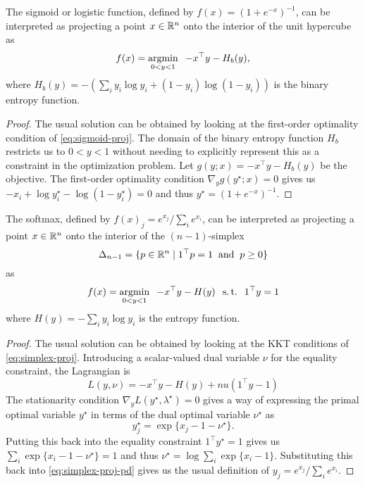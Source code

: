 \begin{theorem}
  The sigmoid or logistic function, defined by $f(x) = (1+e^{-x})^{-1}$,
  can be interpreted as projecting a point $x\in\mathbb{R}^n$ onto
  the interior of the unit hypercube as
  \begin{equation}
    f(x) = \operatorname*{argmin}_{0<y<1} \;\; -x^\top y -H_b(y),
    \label{eq:sigmoid-proj}
  \end{equation}
  where $H_b(y) = - \left(\sum_i y_i\log y_i + (1-y_i)\log (1-y_i)\right)$ is the
  binary entropy function.
\end{theorem}

\begin{proof}
  The usual solution can be obtained by looking at
  the first-order optimality condition of
  \cref{eq:sigmoid-proj}.
  The domain of the binary entropy function $H_b$ restricts
  us to $0<y<1$ without needing to explicitly represent this
  as a constraint in the optimization problem.
  Let $g(y; x) = -x^\top y -H_b(y)$ be the objective.
  The first-order optimality condition $\nabla_y g(y^\star; x) = 0$
  gives us $-x_i + \log y_i^\star - \log (1-y_i^\star) = 0$
  and thus $y^\star = (1+e^{-x})^{-1}$.
\end{proof}

\begin{theorem}
  The softmax, defined by $f(x)_j = e^{x_j} / \sum_i e^{x_i}$,
  can be interpreted as projecting a point $x\in\mathbb{R}^n$ onto
  the interior of the $(n-1)$-simplex
  $$\Delta_{n-1}=\{p\in\mathbb{R}^n\; \vert\; 1^\top p = 1 \; \; {\rm and} \;\; p \geq 0 \}$$
  as
  \begin{equation}
    f(x) = \operatorname*{argmin}_{0<y<1} \;\; -x^\top y - H(y) \;\; \operatorname*{s.t.}\;\; 1^\top y = 1
    \label{eq:simplex-proj}
  \end{equation}
  where $H(y) = -\sum_i y_i \log y_i$ is the entropy function.
\end{theorem}

\begin{proof}
  The usual solution can be obtained by looking at
  the KKT conditions of \cref{eq:simplex-proj}.
  Introducing a scalar-valued dual variable $\nu$ for the
  equality constraint, the Lagrangian is
  \begin{equation}
    L(y, \nu) = -x^\top y - H(y) + nu(1^\top y - 1)
  \end{equation}
  The stationarity condition
  $\nabla_y L(y^\star, \lambda^\star) = 0$
  gives a way of expressing the primal optimal
  variable $y^\star$ in terms of the dual optimal
  variable $\nu^\star$ as
  \begin{equation}
    \label{eq:simplex-proj-pd}
    y^\star_j=\exp\{x_j-1-\nu^\star\}.
  \end{equation}
  Putting this back into the equality constraint
  $1^\top y^\star = 1$ gives us
  $\sum_i \exp\{x_i-1-\nu^\star\} = 1$ and thus
  $\nu^\star = \log\sum_i\exp\{x_i-1\}$.
  Substituting this back into \cref{eq:simplex-proj-pd}
  gives us the usual definition of
  $y_j = e^{x_j} / \sum_i e^{x_i}$.
\end{proof}

